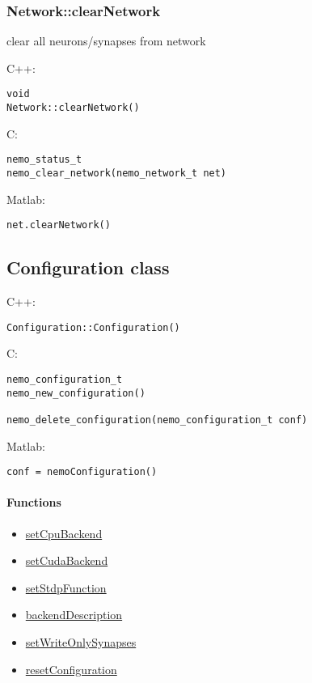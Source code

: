 \clearpage
\subsubsection*{Network::clearNetwork}
\label{fn: clearNetwork}
clear all neurons/synapses from network


\noindent C++:
\begin{lstlisting}[aboveskip=2pt]
void
Network::clearNetwork()
\end{lstlisting}

\noindent C:
\begin{lstlisting}[aboveskip=2pt]
nemo_status_t
nemo_clear_network(nemo_network_t net)
\end{lstlisting}

\noindent Matlab:
\begin{lstlisting}[aboveskip=2pt]
net.clearNetwork()
\end{lstlisting}

\clearpage
\subsection{Configuration class}
\label{Configuration}

\noindent C++:
\begin{lstlisting}[aboveskip=2pt]
Configuration::Configuration()
\end{lstlisting}

\noindent C:
\begin{lstlisting}[aboveskip=2pt]
nemo_configuration_t
nemo_new_configuration()
 
nemo_delete_configuration(nemo_configuration_t conf)
\end{lstlisting}

\noindent Matlab:
\begin{lstlisting}[aboveskip=2pt]
conf = nemoConfiguration()
\end{lstlisting}
\paragraph{Functions}
\begin{itemize}
\item \hyperref[fn: setCpuBackend]{setCpuBackend}
\item \hyperref[fn: setCudaBackend]{setCudaBackend}
\item \hyperref[fn: setStdpFunction]{setStdpFunction}
\item \hyperref[fn: backendDescription]{backendDescription}
\item \hyperref[fn: setWriteOnlySynapses]{setWriteOnlySynapses}
\item \hyperref[fn: resetConfiguration]{resetConfiguration}
\end{itemize}
\clearpage
